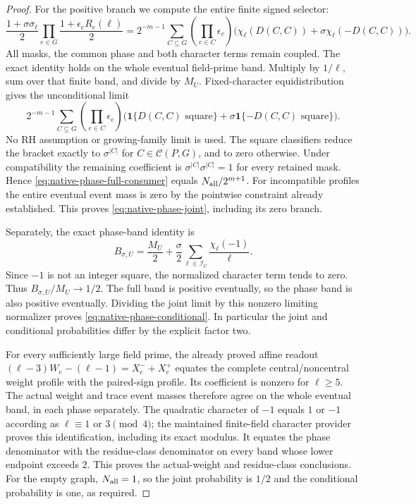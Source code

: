 \documentclass[11pt]{article}
\begin{document}
\begin{proof}
For the positive branch we compute the entire finite signed selector:
\[
 \frac{1+\sigma\sigma_\ell}{2}
        \prod_{e\in G}\frac{1+\epsilon_eR_e(\ell)}2
 =
 2^{-m-1}\sum_{C\subseteq G}
    \left(\prod_{e\in C}\epsilon_e\right)
       \bigl(\chi_\ell(D(C,C))+
                      \sigma\chi_\ell(-D(C,C))\bigr).
\]
All masks, the common phase and both character terms remain coupled.
The exact identity holds on the whole eventual field-prime band.
Multiply by \(1/\ell\), sum over that finite band, and divide by \(M_U\).
Fixed-character equidistribution gives the unconditional limit
\begin{equation}\label{eq:native-phase-full-consumer}
 2^{-m-1}\sum_{C\subseteq G}
  \left(\prod_{e\in C}\epsilon_e\right)
   \bigl(\mathbf1\{D(C,C)\text{ square}\}
       +\sigma\mathbf1\{-D(C,C)\text{ square}\}\bigr).
\end{equation}
No RH assumption or growing-family limit is used.
The square classifiers reduce the bracket exactly to
\(\sigma^{|C|}\) for \(C\in\mathcal C(P,G)\), and to zero otherwise.
Under compatibility the remaining coefficient is
\(\sigma^{|C|}\sigma^{|C|}=1\) for every retained mask.
Hence \eqref{eq:native-phase-full-consumer} equals
\(N_{\rm all}/2^{m+1}\). For incompatible profiles the entire eventual
event mass is zero by the pointwise constraint already established.
This proves \eqref{eq:native-phase-joint}, including its zero branch.

Separately, the exact phase-band identity is
\[
 B_{\sigma,U}=\frac{M_U}{2}
       +\frac{\sigma}{2}\sum_{\ell\in\mathcal I_U}
                                  \frac{\chi_\ell(-1)}{\ell}.
\]
Since \(-1\) is not an integer square, the normalized character term
tends to zero. Thus \(B_{\sigma,U}/M_U\to1/2\).
The full band is positive eventually, so the phase band is also
positive eventually. Dividing the joint limit by this nonzero limiting
normalizer proves \eqref{eq:native-phase-conditional}.
In particular the joint and conditional probabilities differ by the
explicit factor two.

For every sufficiently large field prime, the already proved affine
readout \((\ell-3)W_e-(\ell-1)=X^-_e+X^+_e\) equates the complete
central/noncentral weight profile with the paired-sign profile.
Its coefficient is nonzero for \(\ell\geq5\).
The actual weight and trace event masses therefore agree on the whole
eventual band, in each phase separately.
The quadratic character of \(-1\) equals \(1\) or \(-1\) according as
\(\ell\equiv1\) or \(3\pmod4\); the maintained finite-field character
provider proves this identification, including its exact modulus.
It equates the phase denominator with the residue-class denominator
on every band whose lower endpoint exceeds \(2\).
This proves the actual-weight and residue-class conclusions.
For the empty graph, \(N_{\rm all}=1\), so the joint probability is
\(1/2\) and the conditional probability is one, as required.
\end{proof}
\end{document}
